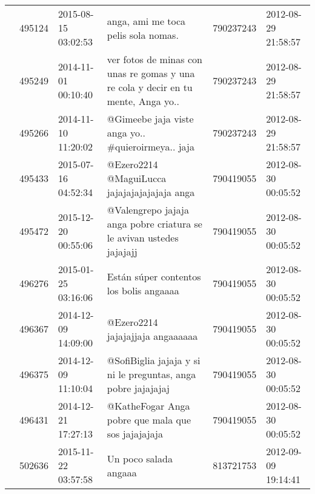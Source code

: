 \begin{tabular}{llllrl}
           & 495124  & 2015-08-15 03:02:53 &                                                                                                          anga, ami me toca pelis sola nomas. &   790237243 & 2012-08-29 21:58:57 \\
           & 495249  & 2014-11-01 00:10:40 &                                                            ver fotos de minas con unas re gomas y una re cola y decir en tu mente, Anga yo.. &   790237243 & 2012-08-29 21:58:57 \\
           & 495266  & 2014-11-10 11:20:02 &                                                                                           @Gimeebe jaja viste anga yo.. \#quieroirmeya.. jaja &   790237243 & 2012-08-29 21:58:57 \\
           & 495433  & 2015-07-16 04:52:34 &                                                                                                 @Ezero2214 @MaguiLucca jajajajajajajaja anga &   790419055 & 2012-08-30 00:05:52 \\
           & 495472  & 2015-12-20 00:55:06 &                                                                         @Valengrepo jajaja anga pobre criatura se le avivan ustedes jajajajj &   790419055 & 2012-08-30 00:05:52 \\
           & 496276  & 2015-01-25 03:16:06 &                                                                                                     Están súper contentos  los bolis angaaaa &   790419055 & 2012-08-30 00:05:52 \\
           & 496367  & 2014-12-09 14:09:00 &                                                                                                             @Ezero2214 jajajajjaja angaaaaaa &   790419055 & 2012-08-30 00:05:52 \\
           & 496375  & 2014-12-09 11:10:04 &                                                                                @SofiBiglia jajaja y si ni le preguntas, anga pobre jajajajaj &   790419055 & 2012-08-30 00:05:52 \\
           & 496431  & 2014-12-21 17:27:13 &                                                                                           @KatheFogar Anga pobre que mala que sos jajajajaja &   790419055 & 2012-08-30 00:05:52 \\
           & 502636  & 2015-11-22 03:57:58 &                                                                                                                        Un poco salada angaaa &   813721753 & 2012-09-09 19:14:41 \\

\end{tabular}
